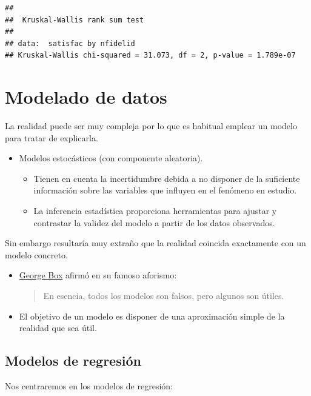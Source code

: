 \documentclass[]{book}
\begin{document}
\begin{verbatim}
## 
##  Kruskal-Wallis rank sum test
## 
## data:  satisfac by nfidelid
## Kruskal-Wallis chi-squared = 31.073, df = 2, p-value = 1.789e-07
\end{verbatim}

\chapter{Modelado de datos}\label{modelado-de-datos}

La realidad puede ser muy compleja por lo que es habitual emplear un
modelo para tratar de explicarla.

\begin{itemize}
\item
  Modelos estocásticos (con componente aleatoria).

  \begin{itemize}
  \item
    Tienen en cuenta la incertidumbre debida a no disponer de la
    suficiente información sobre las variables que influyen en el
    fenómeno en estudio.
  \item
    La inferencia estadística proporciona herramientas para ajustar y
    contrastar la validez del modelo a partir de los datos observados.
  \end{itemize}
\end{itemize}

Sin embargo resultaría muy extraño que la realidad coincida exactamente
con un modelo concreto.

\begin{itemize}
\item
  \href{https://en.wikipedia.org/wiki/George_E._P._Box}{George Box}
  afirmó en su famoso aforismo:

  \begin{quote}
  En esencia, todos los modelos son falsos, pero algunos son útiles.
  \end{quote}
\item
  El objetivo de un modelo es disponer de una aproximación simple de la
  realidad que sea útil.
\end{itemize}

\section{Modelos de regresión}\label{modelos-de-regresion}

Nos centraremos en los modelos de regresión:
\end{document}
